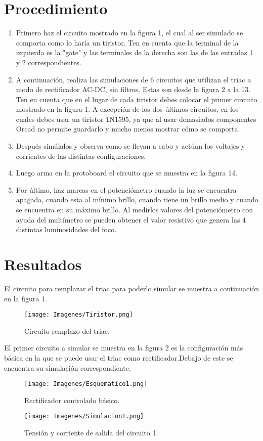 \documentclass[letterpaper]{article}
\begin{document}
\section{Procedimiento}
\begin{enumerate}
    \item Primero haz el circuito mostrado en la figura 1, el cual al ser simulado se comporta como lo haría un tiristor. Ten en cuenta que la terminal de la izquierda es la "gate" y las terminales de la derecha son las de las entradas 1 y 2 correspondientes.
    \item A continuación, realiza las simulaciones de 6 circuitos que utilizan el triac a modo de rectificador AC-DC, sin filtros. Estas son desde la figura 2 a la 13. Ten en cuenta que en el lugar de cada tiristor debes colocar el primer circuito mostrado en la figura 1. A excepción de los dos últimos circuitos, en los cuales debes usar un tiristor 1N1595, ya que al usar demasiados componentes Orcad no permite guardarlo y mucho menos mostrar cómo se comporta.
    \item Después simúlalos y observa como se llevan a cabo y actúan los voltajes y corrientes de las distintas configuraciones.
    \item Luego arma en la protoboard el circuito que se muestra en la figura 14. 
    \item Por último, haz marcas en el potenciómetro cuando la luz se encuentra apagada, cuando esta al mínimo brillo, cuando tiene un brillo medio y cuando se encuentra en su máximo brillo. Al medirlos valores del potenciómetro con ayuda del multímetro se pueden obtener el valor resistivo que genera las 4 distintas luminosidades del foco.
    
\end{enumerate}

\newpage

\section{Resultados}
El circuito para remplazar el triac para poderlo simular se muestra a continuación en la figura 1.
\begin{figure}[h]
    \centering
    \texttt{[image: Imagenes/Tiristor.png]}
    \caption{Circuito remplazo del triac.}
    \label{fig:my_label}
\end{figure}

El primer circuito a simular se muestra en la figura 2 es la configuración más básica en la que se puede usar el triac como rectificador.Debajo de este se encuentra su simulación correspondiente.
\begin{figure}[ht]
    \centering
    \texttt{[image: Imagenes/Esquematico1.png]}
    \caption{Rectificador controlado básico.}
    \label{fig:my_label0}
\end{figure}
\begin{figure}[ht]
    \centering
    \texttt{[image: Imagenes/Simulacion1.png]}
    \caption{Tensión y corriente de salida del circuito 1.}
    \label{fig:my_label1}
\end{figure}
\end{document}
